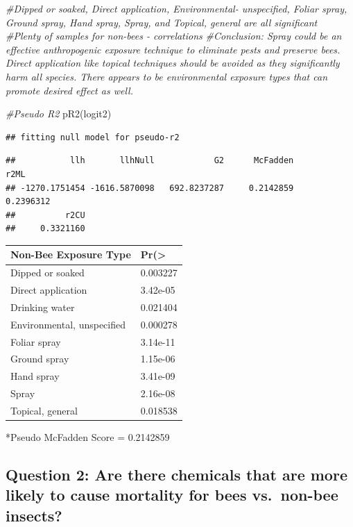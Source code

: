 \documentclass[
  12pt,
]{article}
\newenvironment{Shaded}{\begin{snugshade}}{\end{snugshade}}
\newcommand{\CommentTok}[1]{\textcolor[rgb]{0.56,0.35,0.01}{\textit{#1}}}
\newcommand{\FunctionTok}[1]{\textcolor[rgb]{0.00,0.00,0.00}{#1}}
\newcommand{\NormalTok}[1]{#1}
\begin{document}
\begin{Shaded}
\begin{Highlighting}[]
\CommentTok{\#Dipped or soaked, Direct application, Environmental{-} unspecified, Foliar spray, Ground spray, Hand spray, Spray, and Topical, general are all significant }
\CommentTok{\#Plenty of samples for non{-}bees {-} correlations  }
\CommentTok{\#Conclusion: Spray could be an effective anthropogenic exposure technique to eliminate pests and preserve bees. Direct application like topical techniques should be avoided as they significantly harm all species. There appears to be environmental exposure types that can promote desired effect as well.}

\CommentTok{\#Pseudo R2}
 \FunctionTok{pR2}\NormalTok{(logit2)}
\end{Highlighting}
\end{Shaded}

\begin{verbatim}
## fitting null model for pseudo-r2
\end{verbatim}

\begin{verbatim}
##           llh       llhNull            G2      McFadden          r2ML 
## -1270.1751454 -1616.5870098   692.8237287     0.2142859     0.2396312 
##          r2CU 
##     0.3321160
\end{verbatim}

\begin{longtable}[]{@{}ll@{}}
\toprule
Non-Bee Exposure Type & Pr(\textgreater{} \\
\midrule
\endhead
Dipped or soaked & 0.003227 \\
Direct application & 3.42e-05 \\
Drinking water & 0.021404 \\
Environmental, unspecified & 0.000278 \\
Foliar spray & 3.14e-11 \\
Ground spray & 1.15e-06 \\
Hand spray & 3.41e-09 \\
Spray & 2.16e-08 \\
Topical, general & 0.018538 \\
\bottomrule
\end{longtable}

*Pseudo McFadden Score = 0.2142859

\hypertarget{question-2-are-there-chemicals-that-are-more-likely-to-cause-mortality-for-bees-vs.-non-bee-insects}{%
\subsection{Question 2: Are there chemicals that are more likely to
cause mortality for bees vs.~non-bee
insects?}\label{question-2-are-there-chemicals-that-are-more-likely-to-cause-mortality-for-bees-vs.-non-bee-insects}}
\end{document}
